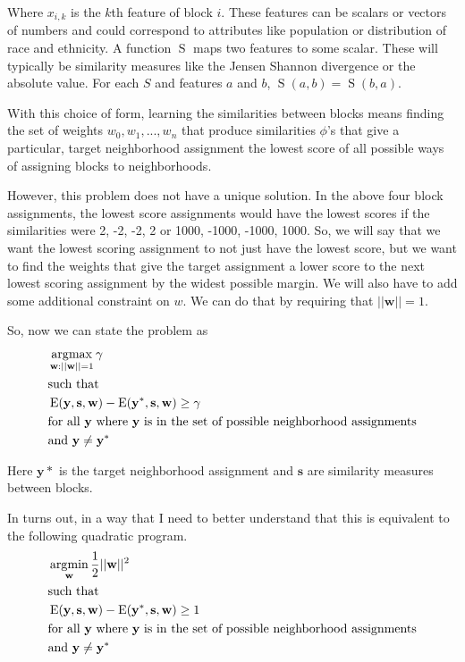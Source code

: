 Where $x_{i,k}$ is the $k$th feature of block $i$. These
features can be scalars or vectors of numbers and could correspond to
attributes like population or distribution of race and ethnicity. A
function $\operatorname{S}$ maps two features to some scalar. These
will typically be similarity measures like the Jensen Shannon
divergence or the absolute value. For each $S$ and features $a$ and
$b$, $\operatorname{S}(a,b) = \operatorname{S}(b,a)$.

With this choice of form, learning the similarities between blocks
means finding the set of weights $w_0, w_1, ..., w_n$ that produce
similarities $\phi$'s that give a particular, target neighborhood
assignment the lowest score of all possible ways of assigning blocks
to neighborhoods. 

However, this problem does not have a unique solution. In the above
four block assignments, the lowest score assignments would have the
lowest scores if the similarities were 2, -2, -2, 2 or 1000, -1000,
-1000, 1000. So, we will say that we want the lowest scoring
assignment to not just have the lowest score, but we want to find the
weights that give the target assignment a lower score to the next
lowest scoring assignment by the widest possible margin. We will also
have to add some additional constraint on $w$. We can do that by
requiring that $||\mathbf{w}||=1$.

So, now we can state the problem as 
%
\begin{align*}
&\operatorname*{\arg\!\max}_{\mathbf{w}:||\mathbf{w}||=1} \mathbf{\gamma} \\
&\text{such that} \\
&\operatorname{E}(\mathbf{y}, \mathbf{s}, \mathbf{w})
- \operatorname{E}(\mathbf{y}^*, \mathbf{s}, \mathbf{w}) \geq \gamma\\ 
&\text{for all } \mathbf{y} \text{ where } \mathbf{y} \text{ is in the set of
  possible neighborhood assignments}\\
&\text{and } \mathbf{y} \neq \mathbf{y}^*
\end{align*}
%

Here $\mathbf{y}*$ is the target neighborhood assignment and $\mathbf{s}$
are similarity measures between blocks. 


In turns out, in a way that I need to better understand that this is
equivalent to the following quadratic program.
%
\begin{align*}
&\operatorname*{\arg\!\min}_{\mathbf{w}} \frac{1}{2}||\mathbf{w}||^2 \\
&\text{such that} \\
&\operatorname{E}(\mathbf{y}, \mathbf{s}, \mathbf{w})
- \operatorname{E}(\mathbf{y}^*, \mathbf{s}, \mathbf{w}) \geq 1 \\ 
&\text{for all } \mathbf{y} \text{ where } \mathbf{y} \text{ is in the set of
  possible neighborhood assignments}\\
&\text{and } \mathbf{y} \neq \mathbf{y}^*
\end{align*}


